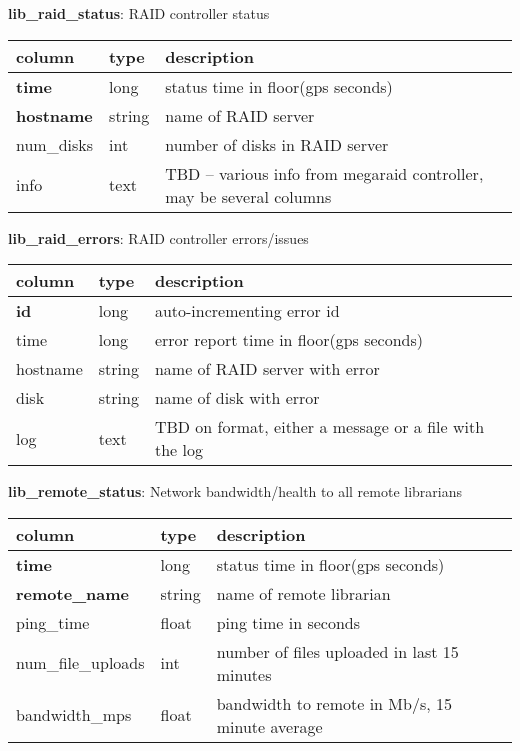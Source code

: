 \documentclass{article}
\begin{document}
\textbf{\large{lib\_raid\_status}}: RAID controller status
\begin{center}
 \begin{tabular}{| p{4cm} | p{2cm} | p{10cm} |} 
\hline
 column & type & description \\ [0.5ex]  \hline\hline
\textbf{time} & long & status time in floor(gps seconds) \\ \hline
\textbf{hostname} & string & name of RAID server \\ \hline
num\_disks & int & number of disks in RAID server  \\\hline
info & text & TBD -- various info from megaraid controller, may be several columns \\\hline
\end{tabular}
\end{center}

\textbf{\large{lib\_raid\_errors}}: RAID controller errors/issues
\begin{center}
 \begin{tabular}{| p{4cm} | p{2cm} | p{10cm} |} 
\hline
 column & type & description \\ [0.5ex]  \hline\hline
\textbf{id} & long & auto-incrementing error id\\ \hline
time & long & error report time in floor(gps seconds)\\ \hline
hostname & string & name of RAID server with error \\ \hline
disk & string & name of disk with error \\ \hline
log & text & TBD on format, either a message or a file with the log \\\hline
\end{tabular}
\end{center}

\textbf{\large{lib\_remote\_status}}: Network bandwidth/health to all remote librarians
\begin{center}
 \begin{tabular}{| p{4cm} | p{2cm} | p{10cm} |} 
\hline
 column & type & description \\ [0.5ex]  \hline\hline
\textbf{time} & long & status time in floor(gps seconds)\\ \hline
\textbf{remote\_name} & string & name of remote librarian \\ \hline
ping\_time & float & ping time in seconds \\\hline
num\_file\_uploads & int & number of files uploaded in last 15 minutes  \\\hline
bandwidth\_mps & float & bandwidth to remote in Mb/s, 15 minute average \\\hline
\end{tabular}
\end{center}
\end{document}
